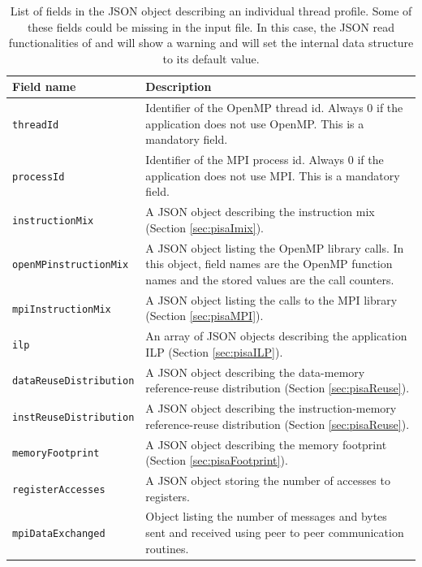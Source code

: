 \documentclass[a4paper, 10pt]{article}
\begin{document}
  \begin{table}[t!]
\centering
\scriptsize
\caption{List of fields in the JSON object describing an individual thread profile. Some of these fields could be missing in the input file. In this case,
the JSON read functionalities of \ex and \eb will show a warning and will set the internal data structure to its default value.}
  \begin{tabular}{|p{3cm} ||p{8.2cm}| }
   \hline
  \textbf{Field name} & \textbf{Description} \\
   \hline
   \hline
   \texttt{threadId} & Identifier of the OpenMP thread id. Always 0 if the application does not use OpenMP. This is a mandatory field. \\
   \hline
   \texttt{processId} & Identifier of the MPI process id. Always 0 if the application does not use MPI. This is a mandatory field. \\
   \hline
   \texttt{instructionMix} & A JSON object describing the instruction mix (Section \ref{sec:pisaImix}). \\
   \hline
   \texttt{openMPinstructionMix} & A JSON object listing the OpenMP library calls. In this object, field
   names are the OpenMP function names and the stored values are the call counters.  \\
   \hline
   \texttt{mpiInstructionMix} & A JSON object listing the calls to the MPI library (Section \ref{sec:pisaMPI}). \\
   \hline
   \texttt{ilp} & An array of JSON objects describing the application ILP (Section \ref{sec:pisaILP}). \\
   \hline
   \texttt{dataReuseDistribution} & A JSON object describing the data-memory reference-reuse distribution (Section \ref{sec:pisaReuse}). \\
   \hline
   \texttt{instReuseDistribution} & A JSON object describing the instruction-memory reference-reuse distribution (Section \ref{sec:pisaReuse}). \\
   \hline
   \texttt{memoryFootprint} & A JSON object describing the memory footprint (Section \ref{sec:pisaFootprint}). \\
   \hline
   \texttt{registerAccesses} & A JSON object storing the number of accesses to registers. \\%
   \hline
   \texttt{mpiDataExchanged} & Object listing the number of messages and bytes sent and received using peer to peer communication routines.

\end{tabular}
\end{table}
\end{document}
